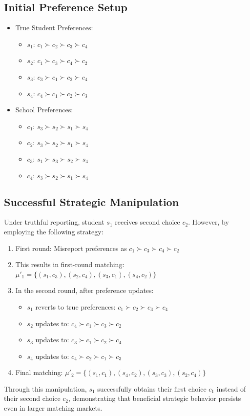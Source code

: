 \documentclass{article}
\begin{document}
\subsection{Initial Preference Setup}
\begin{itemize}
    \item True Student Preferences:
    \begin{itemize}
        \item $s_1$: $c_1 \succ c_2 \succ c_3 \succ c_4$
        \item $s_2$: $c_1 \succ c_3 \succ c_4 \succ c_2$
        \item $s_3$: $c_3 \succ c_1 \succ c_2 \succ c_4$
        \item $s_4$: $c_4 \succ c_1 \succ c_2 \succ c_3$
    \end{itemize}
    \item School Preferences:
    \begin{itemize}
        \item $c_1$: $s_3 \succ s_2 \succ s_1 \succ s_4$
        \item $c_2$: $s_3 \succ s_2 \succ s_1 \succ s_4$
        \item $c_3$: $s_1 \succ s_3 \succ s_2 \succ s_4$
        \item $c_4$: $s_3 \succ s_2 \succ s_1 \succ s_4$
    \end{itemize}
\end{itemize}

\subsection{Successful Strategic Manipulation}
Under truthful reporting, student $s_1$ receives second choice $c_2$. However, by employing the following strategy:

\begin{enumerate}
    \item First round: Misreport preferences as $c_1 \succ c_3 \succ c_4 \succ c_2$
    \item This results in first-round matching: $\mu'_1 = \{(s_1,c_3), (s_2,c_4), (s_3,c_1), (s_4,c_2)\}$
    \item In the second round, after preference updates:
    \begin{itemize}
        \item $s_1$ reverts to true preferences: $c_1 \succ c_2 \succ c_3 \succ c_4$
        \item $s_2$ updates to: $c_4 \succ c_1 \succ c_3 \succ c_2$
        \item $s_3$ updates to: $c_3 \succ c_1 \succ c_2 \succ c_4$
        \item $s_4$ updates to: $c_4 \succ c_2 \succ c_1 \succ c_3$
    \end{itemize}
    \item Final matching: $\mu'_2 = \{(s_1,c_1), (s_4,c_2), (s_3,c_3), (s_2,c_4)\}$
\end{enumerate}
Through this manipulation, $s_1$ successfully obtains their first choice $c_1$ instead of their second choice $c_2$, demonstrating that beneficial strategic behavior persists even in larger matching markets.
\end{document}
